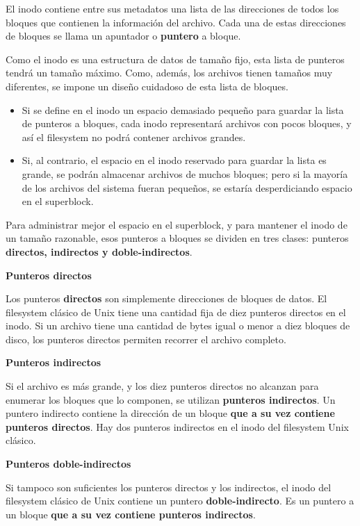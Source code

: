 \documentclass[spanish,a4paper,]{article}
\providecommand{\tightlist}{%
  \setlength{\itemsep}{0pt}\setlength{\parskip}{0pt}}
\begin{document}
El inodo contiene entre sus metadatos una lista de las direcciones de
todos los bloques que contienen la información del archivo. Cada una de
estas direcciones de bloques se llama un apuntador o \textbf{puntero} a
bloque.

Como el inodo es una estructura de datos de tamaño fijo, esta lista de
punteros tendrá un tamaño máximo. Como, además, los archivos tienen
tamaños muy diferentes, se impone un diseño cuidadoso de esta lista de
bloques.

\begin{itemize}
\tightlist
\item
  Si se define en el inodo un espacio demasiado pequeño para guardar la
  lista de punteros a bloques, cada inodo representará archivos con
  pocos bloques, y así el filesystem no podrá contener archivos grandes.
\item
  Si, al contrario, el espacio en el inodo reservado para guardar la
  lista es grande, se podrán almacenar archivos de muchos bloques; pero
  si la mayoría de los archivos del sistema fueran pequeños, se estaría
  desperdiciando espacio en el superblock.
\end{itemize}

Para administrar mejor el espacio en el superblock, y para mantener el
inodo de un tamaño razonable, esos punteros a bloques se dividen en tres
clases: punteros \textbf{directos, indirectos y doble-indirectos}.

\textbf{Punteros directos}

Los punteros \textbf{directos} son simplemente direcciones de bloques de
datos. El filesystem clásico de Unix tiene una cantidad fija de diez
punteros directos en el inodo. Si un archivo tiene una cantidad de bytes
igual o menor a diez bloques de disco, los punteros directos permiten
recorrer el archivo completo.

\textbf{Punteros indirectos}

Si el archivo es más grande, y los diez punteros directos no alcanzan
para enumerar los bloques que lo componen, se utilizan \textbf{punteros
indirectos}. Un puntero indirecto contiene la dirección de un bloque
\textbf{que a su vez contiene punteros directos}. Hay dos punteros
indirectos en el inodo del filesystem Unix clásico.

\textbf{Punteros doble-indirectos}

Si tampoco son suficientes los punteros directos y los indirectos, el
inodo del filesystem clásico de Unix contiene un puntero
\textbf{doble-indirecto}. Es un puntero a un bloque \textbf{que a su vez
contiene punteros indirectos}.
\end{document}
